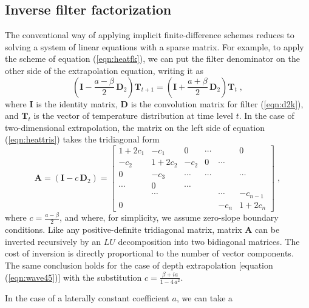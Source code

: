 \subsection{Inverse filter factorization}
The conventional way of applying implicit finite-difference schemes
reduces to solving a system of linear equations with a sparse matrix.
For example, to apply the scheme of equation (\ref{eqn:heatfk}), we
can put the filter denominator on the other side of the extrapolation
equation, writing it as
\begin{equation}
  \label{eqn:heattris}
  \left(\mathbf{I} - \frac{a-\beta}{2}\,\mathbf{D}_2\right) \mathbf{T}_{t+1} =
  \left(\mathbf{I} + \frac{a+\beta}{2}\,\mathbf{D}_2\right) \mathbf{T}_t\;,
\end{equation}
where $\mathbf{I}$ is the identity matrix, $\mathbf{D}$ is the convolution
matrix for filter (\ref{eqn:d2k}), and $\mathbf{T}_t$ is the vector of
temperature distribution at time level $t$. In the case of
two-dimensional extrapolation, the matrix on the left side of equation
(\ref{eqn:heattris}) takes the tridiagonal form
\begin{equation}\label{eqn:matrix}
  \mathbf{A} = \left(\mathbf{I} -c\,\mathbf{D}_2\right) =
  \left[\begin{array}{cccccc}
  1+2 c_{1}   & -c_{1}     &  0     & \cdots &        & 0      \\
  -c_{2}     & 1+2c_{2}   & -c_{2}     & 0      & \cdots &        \\
  0      & -c_{3}     & \cdots & \cdots &        & \cdots \\
  \cdots & 0      & \cdots &        &        &        \\
         & \cdots &        &        & \cdots & -c_{n-1}     \\
  0      &        &        &        & -c_{n}     & 1 + 2c_{n}
  \end{array}\right]\;,
\end{equation}
where $c = \frac{a-\beta}{2}$, and where, for simplicity, we assume
zero-slope boundary conditions. Like any positive-definite tridiagonal
matrix, matrix $\mathbf{A}$ can be inverted recursively by an $LU$
decomposition into two bidiagonal matrices. The cost of inversion is
directly proportional to the number of vector components.  The same
conclusion holds for the case of depth extrapolation [equation
(\ref{eqn:wave45})] with the substitution $c = \frac{\beta + i
  a}{1-4\,a^2}$.
\par
In the case of a laterally constant coefficient $a$, we can take a
